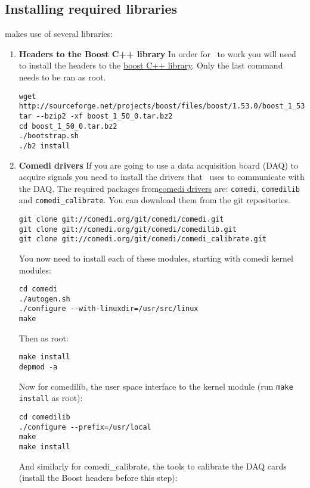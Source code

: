 \subsection{Installing required libraries} 
\label{install:required}
\textbf{\progname} makes use of several libraries:
\begin{enumerate}
	\item \textbf{Headers to the Boost C++ library}
	In order for \progname\ to work you will need to install the headers to the \href{http://www.boost.org}{boost C++ library}. Only the last command needs to be ran as root.
\begin{lstlisting}
wget http://sourceforge.net/projects/boost/files/boost/1.53.0/boost_1_53_0.tar.bz2
tar --bzip2 -xf boost_1_50_0.tar.bz2
cd boost_1_50_0.tar.bz2
./bootstrap.sh
./b2 install
\end{lstlisting}

	\item \textbf{Comedi drivers}
If you are going to use a data acquisition board (DAQ) to acquire signals you need to install the drivers that \progname\ uses to communicate with the DAQ. The required packages from\href{http://www.comedi.org}{comedi drivers} are: \texttt{comedi}, \texttt{comedilib} and \texttt{comedi\_calibrate}. You can download them from the git repositories.
\begin{lstlisting}
git clone git://comedi.org/git/comedi/comedi.git
git clone git://comedi.org/git/comedi/comedilib.git
git clone git://comedi.org/git/comedi/comedi_calibrate.git
\end{lstlisting}
You now need to install each of these modules, starting with comedi kernel modules:

\begin{lstlisting}
cd comedi
./autogen.sh
./configure --with-linuxdir=/usr/src/linux
make
\end{lstlisting}
Then as root:

\begin{lstlisting}
make install
depmod -a
\end{lstlisting}
Now for comedilib, the user space interface to the kernel module (run \texttt{make install} as root):

\begin{lstlisting}
cd comedilib
./configure --prefix=/usr/local
make
make install
\end{lstlisting}
And similarly for comedi\_calibrate, the tools to calibrate the DAQ cards (install the Boost headers before this step):


\end{enumerate}
